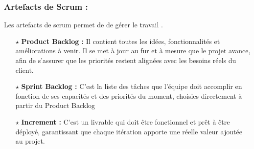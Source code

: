 \subsubsection{ Artefacts de Scrum :}
Les artefacts de scrum permet de  de gérer le travail .
 \begin{itemize}
\item[$\star$] \textbf{Product Backlog : } Il contient toutes les idées, fonctionnalités et améliorations à venir. Il se met à jour au fur et à mesure que le projet avance, afin de s’assurer que les priorités restent alignées avec les besoins réels du client.
\item[$\star$]\textbf{Sprint Backlog : } C’est la liste des tâches que l’équipe doit accomplir en fonction de ses capacités et des priorités du moment, choisies directement à partir du Product Backlog
\item[$\star$]\textbf{ Increment : }C'est un livrable qui doit être fonctionnel et prêt à être déployé, garantissant que chaque itération apporte une réelle valeur ajoutée au projet.
\end{itemize}
